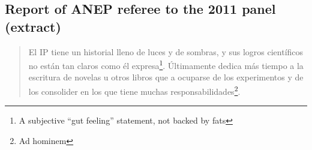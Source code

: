 \subsection*{Report of ANEP referee to the 2011 panel (extract)}


\begin{quotation}
\item El IP tiene un historial lleno de luces y de sombras, y sus logros cient\'ificos no est\'an tan claros como \'el expresa\footnote{A subjective ``gut feeling'' statement, not backed by fats}. \'Ultimamente dedica m\'as tiempo a la escritura de novelas u otros libros que a ocuparse de los experimentos y de los consolider en los que tiene muchas responsabilidades\footnote{Ad hominem}.
\end{quotation}